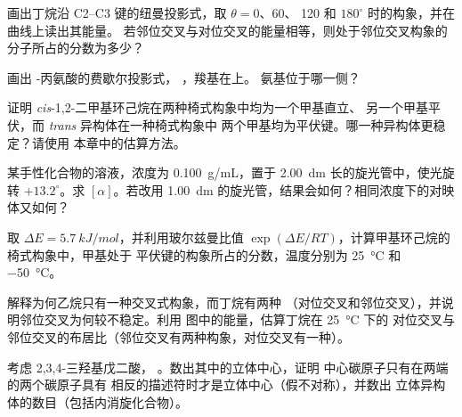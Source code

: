 \begin{exercise}[$\star\star$]\label{exo:b1:stereochemistry-in-depth:5}
画出丁烷沿 C2--C3 键的纽曼投影式，取 $\theta = 0$、60、
120 和 $180^\circ$ 时的构象，并在曲线上读出其能量。
若邻位交叉与对位交叉的能量相等，则处于邻位交叉构象的分子所占的分数为多少？
\end{exercise}

\begin{exercise}[$\star\star$]\label{exo:b1:stereochemistry-in-depth:6}
画出 -丙氨酸的费歇尔投影式，
，羧基在上。
氨基位于哪一侧？
\end{exercise}

\begin{exercise}[$\star\star$]\label{exo:b1:stereochemistry-in-depth:7}
证明 \textit{cis}-1,2-二甲基环己烷在两种椅式构象中均为一个甲基直立、
另一个甲基平伏，而 \textit{trans} 异构体在一种椅式构象中
两个甲基均为平伏键。哪一种异构体更稳定？请使用
本章中的估算方法。
\end{exercise}

\begin{exercise}[$\star\star$]\label{exo:b1:stereochemistry-in-depth:8}
某手性化合物的溶液，浓度为 \qty{0.100}{g/mL}，置于 \qty{2.00}{dm}
长的旋光管中，使光旋转 $+13.2^\circ$。求 $[\alpha]$。若改用
\qty{1.00}{dm} 的旋光管，结果会如何？相同浓度下的对映体又如何？
\end{exercise}

\begin{exercise}[$\star\star$]\label{exo:b1:stereochemistry-in-depth:9}
取 $\Delta E = \qty{5.7}{kJ/mol}$，并利用玻尔兹曼比值
$\exp(\Delta E/RT)$，计算甲基环己烷的椅式构象中，甲基处于
平伏键的构象所占的分数，温度分别为 \qty{25}{\celsius} 和 \qty{-50}{\celsius}。
\end{exercise}

\begin{exercise}[$\star\star\star$]\label{exo:b1:stereochemistry-in-depth:10}
解释为何乙烷只有一种交叉式构象，而丁烷有两种
（对位交叉和邻位交叉），并说明邻位交叉为何较不稳定。利用
图中的能量，估算丁烷在 \qty{25}{\celsius} 下的
对位交叉与邻位交叉的布居比（邻位交叉有两种构象，对位交叉有一种）。
\end{exercise}

\begin{exercise}[$\star\star\star$]\label{exo:b1:stereochemistry-in-depth:11}
考虑 2,3,4-三羟基戊二酸，
。数出其中的立体中心，证明
中心碳原子只有在两端的两个碳原子具有
相反的描述符时才是立体中心（假不对称），并数出
立体异构体的数目（包括内消旋化合物）。
\end{exercise}

